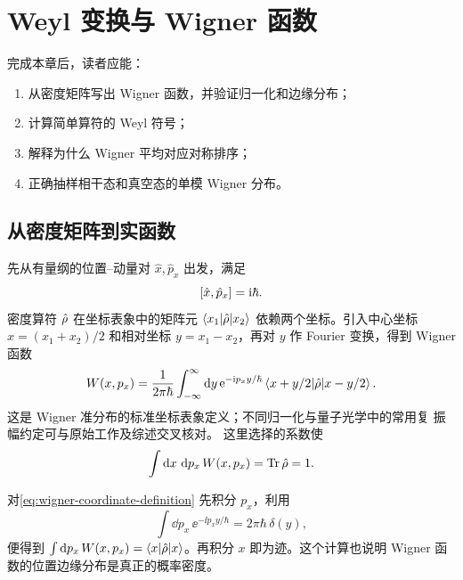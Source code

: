\chapter{Weyl 变换与 Wigner 函数}
\label{ch:weyl-wigner}

\begin{learningobjectives}
完成本章后，读者应能：
\begin{enumerate}
  \item 从密度矩阵写出 Wigner 函数，并验证归一化和边缘分布；
  \item 计算简单算符的 Weyl 符号；
  \item 解释为什么 Wigner 平均对应对称排序；
  \item 正确抽样相干态和真空态的单模 Wigner 分布。
\end{enumerate}
\end{learningobjectives}

\section{从密度矩阵到实函数}

先从有量纲的位置--动量对 $\hat x,\hat p_x$ 出发，满足
\begin{equation}
  \left[\hat x,\hat p_x\right]=\mathrm{i}\hbar.
\end{equation}
密度算符 $\hat\rho$ 在坐标表象中的矩阵元 $\left\langle x_1\middle\vert \hat\rho\middle\vert x_2\right\rangle$ 依赖两个坐标。引入中心坐标 $x=(x_1+x_2)/2$ 和相对坐标 $y=x_1-x_2$，再对 $y$ 作 Fourier 变换，得到 Wigner 函数
\begin{equation}
  W(x,p_x)=\frac{1}{2\pi\hbar}
  \int_{-\infty}^{\infty}\mathop{}\!\mathrm{d} y\,
  \mathrm{e}^{-\mathrm{i} p_x y/\hbar}
  \left\langle x+y/2\middle\vert \hat\rho\middle\vert x-y/2\right\rangle.
  \label{eq:wigner-coordinate-definition}
\end{equation}
这是 Wigner 准分布的标准坐标表象定义；不同归一化与量子光学中的常用复
振幅约定可与原始工作及综述交叉核对\cite{Wigner1932,Hillery1984}。
这里选择的系数使
\begin{equation}
  \int\mathop{}\!\mathrm{d} x\,\mathop{}\!\mathrm{d} p_x\,W(x,p_x)=\operatorname{Tr}\hat\rho=1.
  \label{eq:wigner-normalization}
\end{equation}

\begin{derivationbox}
对\cref{eq:wigner-coordinate-definition} 先积分 $p_x$，利用
\[
  \int\dd p_x\,\ee^{-\ii p_x y/\hbar}=2\pi\hbar\,\delta(y),
\]
便得到 $\int\mathop{}\!\mathrm{d} p_x\,W(x,p_x)=\left\langle x\middle\vert \hat\rho\middle\vert x\right\rangle$。再积分 $x$ 即为迹。这个计算也说明 Wigner 函数的位置边缘分布是真正的概率密度。
\end{derivationbox}

